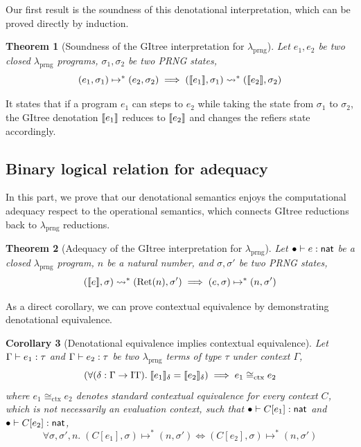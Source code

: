 \documentclass{article}
\theoremstyle{definition}
\theoremstyle{plain}
\newtheorem{theorem}{Theorem}[section]
\newtheorem{corollary}[theorem]{Corollary}
\theoremstyle{remark}
\newcommand{\prng}{\mathrm{prng}}
\newcommand{\redu}{\mapsto}
\newcommand{\Redu}{\rightsquigarrow}
\newcommand{\IT}{\mathrm{IT}}
\newcommand{\gRet}{\mathrm{Ret}}
\begin{document}
Our first result is the soundness of this denotational interpretation, which can be proved directly by induction.
\begin{theorem}[Soundness of the GItree interpretation for \(\lambda_\prng\)]
  Let \(e_1,e_2\) be two closed \(\lambda_\prng\) programs, \(\sigma_1,\sigma_2\) be two PRNG states,
  \[
    (e_1,\sigma_1) \redu^\ast (e_2,\sigma_2)
    \implies
    (\sem{e_1},\sigma_1) \Redu^\ast (\sem{e_2},\sigma_2)
  \]
\end{theorem}

It states that if a program \(e_1\) can steps to \(e_2\) while taking the state from \(\sigma_1\) to \(\sigma_2\),
the GItree denotation \(\llbracket {e_1} \rrbracket\) reduces to \(\llbracket {e_2} \rrbracket\) and changes the refiers state accordingly.

\subsection{Binary logical relation for adequacy}

In this part, we prove that our denotational semantics enjoys the computational adequacy respect to the operational semantics,
which connects GItree reductions back to \(\lambda_\prng\) reductions.

\begin{theorem}[Adequacy of the GItree interpretation for \(\lambda_\prng\)]
  Let \({\bullet}\vdash{e}\mathrel{:}{{ {\mathsf{nat}}}}\) be a closed \(\lambda_\prng\) program, \(n\) be a natural number, and \(\sigma,\sigma'\) be two PRNG states,
  \[
    (\sem{e},\sigma) \Redu^\ast (\gRet(n), \sigma')
    \implies
    (e,\sigma) \redu^\ast (n, \sigma')
  \]
\end{theorem}

As a direct corollary, we can prove contextual equivalence by demonstrating denotational equivalence.

\begin{corollary}[Denotational equivalence implies contextual equivalence]
  Let \({\Gamma}\vdash{e_1}\mathrel{:}{\tau}\) and \({\Gamma}\vdash{e_2}\mathrel{:}{\tau}\) be two \(\lambda_\prng\) terms of type \(\tau\) under context \(\Gamma\),
  \[
    (\forall (\senv : \Gamma \to \IT).\;\sem{e_1}_\senv = \sem{e_2}_\senv)
    \implies
    e_1 \cong_{\mathrm{ctx}} e_2
  \]
  where \(e_1 \cong_{\mathrm{ctx}} e_2\) denotes standard contextual equivalence
  for every context \(C\), which is not necessarily an evaluation context, such that \({\bullet}\vdash{C[e_1]}\mathrel{:}{{ {\mathsf{nat}}}}\) and \({\bullet}\vdash{C[e_2]}\mathrel{:}{{ {\mathsf{nat}}}}\),
  \[
    \forall \sigma, \sigma',n .\;
    (C[e_1],\sigma) \redu^* (n,\sigma')
    \iff
    (C[e_2],\sigma) \redu^* (n,\sigma')
  \]
\end{corollary}
\end{document}
